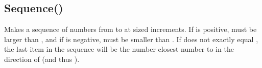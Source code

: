 \documentclass[letterpaper,10pt,english]{sphinxmanual}
\begin{document}
\sphinxAtStartPar
{}

\begin{sphinxVerbatim}[commandchars=\\\{\}]
\PYG{p}{[}\PYG{p}{]}
\end{sphinxVerbatim}

\sphinxAtStartPar
{}

\sphinxAtStartPar
{}

\ignorespaces 

\subsection{Sequence()}
\label{\detokenize{reference/pebllist:sequence}}\label{\detokenize{reference/pebllist:index-20}}
\sphinxAtStartPar
{}

\sphinxAtStartPar
Makes a sequence of numbers from  to    at \sphinxhyphen{}sized increments. If  is   positive,  must be larger than , and if    is negative,  must be smaller than   . If  does not exactly equal   , the last item in the sequence will be the number   closest number to  in the direction of    (and thus ).

\sphinxAtStartPar
{}

\begin{sphinxVerbatim}[commandchars=\\\{\}]
\end{sphinxVerbatim}
\end{document}
